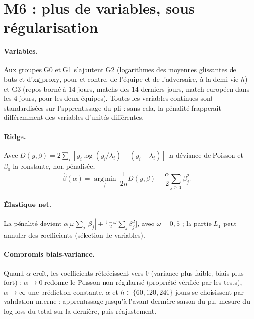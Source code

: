 \section{M6 : plus de variables, sous régularisation}
\label{sec:m6}

\paragraph{Variables.} Aux groupes G0 et G1 s'ajoutent G2 (logarithmes des moyennes glissantes de
buts et d'\(\mathrm{xg\_proxy}\), pour et contre, de l'équipe et de l'adversaire, à la demi-vie
\(h\)) et G3 (repos borné à 14 jours, matchs des 14 derniers jours, match européen dans les 4 jours,
pour les deux équipes). Toutes les variables continues sont standardisées sur l'apprentissage du
pli : sans cela, la pénalité frapperait différemment des variables d'unités différentes.

\paragraph{Ridge.} Avec \(D(y, \beta) = 2\sum_i [y_i \log(y_i/\lambda_i) - (y_i - \lambda_i)]\) la
déviance de Poisson et \(\beta_0\) la constante, non pénalisée,
\[
  \hat\beta(\alpha) = \operatorname*{arg\,min}_{\beta}\ \frac{1}{2n} D(y, \beta)
  + \frac{\alpha}{2} \sum_{j \ge 1} \beta_j^2 .
\]
\paragraph{Élastique net.} La pénalité devient
\(\alpha \big[\omega \sum_j |\beta_j| + \tfrac{1 - \omega}{2} \sum_j \beta_j^2\big]\), avec
\(\omega = 0{,}5\) ; la partie \(L_1\) peut annuler des coefficients (sélection de variables).

\paragraph{Compromis biais-variance.} Quand \(\alpha\) croît, les coefficients rétrécissent vers 0
(variance plus faible, biais plus fort) ; \(\alpha \to 0\) redonne le Poisson non régularisé
(propriété vérifiée par les tests), \(\alpha \to \infty\) une prédiction constante. \(\alpha\) et
\(h \in \{60, 120, 240\}\) jours se choisissent par validation interne : apprentissage jusqu'à
l'avant-dernière saison du pli, mesure du log-loss du total sur la dernière, puis réajustement.

